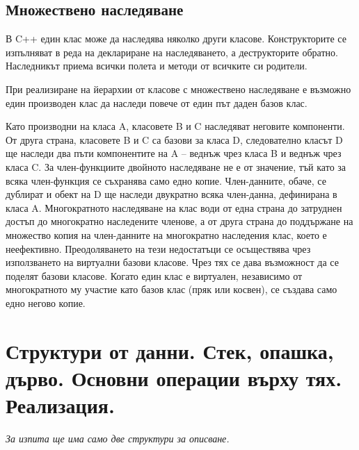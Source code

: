 \documentclass{article}
\renewcommand{\\}{\newline}
\begin{document}
\subsection{Множествено наследяване} В C++ един клас  може да наследява няколко други класове. Конструкторите се изпълняват в реда на деклариране на наследяването, а деструкторите обратно. Наследникът приема всички полета и методи от всичките си родители. 

При реализиране на йерархии от класове с множествено наследяване е възможно един производен клас да наследи повече от един път даден базов клас.


Като производни на класа A, класовете B и C наследяват неговите компоненти. От друга страна, класовете B и C са базови за класа D, следователно класът D ще наследи два пъти компонентите на A – веднъж чрез класа B и веднъж чрез класа C. За член-функциите двойното наследяване не е от значение, тъй като за всяка член-функция се съхранява само едно копие. Член-данните, обаче, се дублират и обект на D ще наследи двукратно всяка член-данна, дефинирана в класа A. Многократното наследяване на клас води от една страна до затруднен достъп до многократно наследените членове, а от друга страна до поддържане на множество копия на член-данните на многократно наследения клас, което е неефективно. Преодоляването на тези недостатъци се осъществява чрез използването на виртуални базови класове. Чрез тях се дава възможност да се поделят базови класове. Когато един клас е виртуален, независимо от многократното му участие като базов клас (пряк или косвен), се създава само едно негово копие.

\newpage

\section{Структури от данни. Стек, опашка, дърво. Основни операции върху тях. Реализация.}
\textit{За изпита ще има само две структури за описване.}
\end{document}
